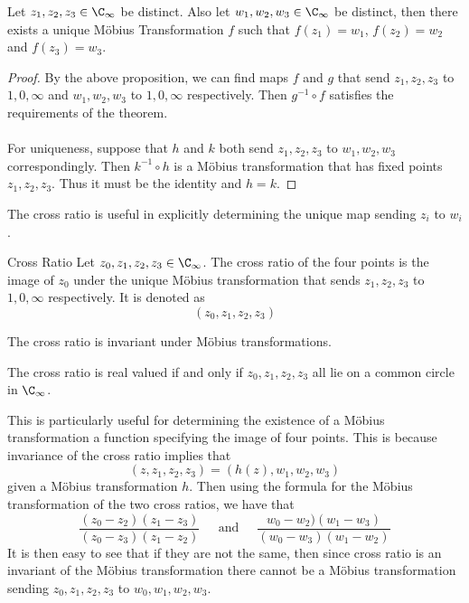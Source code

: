 \documentclass[a4paper]{article}
\begin{document}
\begin{thm}{}{} Let $z_1,z_2,z_3\in\C_\infty$ be distinct. Also let $w_1,w_2,w_3\in\C_\infty$ be distinct, then there exists a unique Möbius Transformation $f$ such that $f(z_1)=w_1$, $f(z_2)=w_2$ and $f(z_3)=w_3$. \tcbline
\begin{proof}
By the above proposition, we can find maps $f$ and $g$ that send $z_1,z_2,z_3$ to $1,0,\infty$ and $w_1,w_2,w_3$ to $1,0,\infty$ respectively. Then $g^{-1}\circ f$ satisfies the requirements of the theorem. \\~\\

For uniqueness, suppose that $h$ and $k$ both send $z_1,z_2,z_3$ to $w_1,w_2,w_3$ correspondingly. Then $k^{-1}\circ h$ is a Möbius transformation that has fixed points $z_1,z_2,z_3$. Thus it must be the identity and $h=k$. 
\end{proof}
\end{thm}

The cross ratio is useful in explicitly determining the unique map sending $z_i$ to $w_i$. 

\begin{defn}{Cross Ratio}{} Let $z_0,z_1,z_2,z_3\in\C_\infty$. The cross ratio of the four points is the image of $z_0$ under the unique Möbius transformation that sends $z_1,z_2,z_3$ to $1,0,\infty$ respectively. It is denoted as $$(z_0,z_1,z_2,z_3)$$
\end{defn}

\begin{thm}{}{} The cross ratio is invariant under Möbius transformations. 
\end{thm}

\begin{thm}{}{} The cross ratio is real valued if and only if $z_0,z_1,z_2,z_3$ all lie on a common circle in $\C_\infty$. 
\end{thm}

This is particularly useful for determining the existence of a Möbius transformation a function specifying the image of four points. This is because invariance of the cross ratio implies that $$(z,z_1,z_2,z_3)=(h(z),w_1,w_2,w_3)$$ given a Möbius transformation $h$. Then using the formula for the Möbius transformation of the two cross ratios, we have that $$\frac{(z_0-z_2)(z_1-z_3)}{(z_0-z_3)(z_1-z_2)}\;\;\;\;\text{ and }\;\;\;\;\frac{w_0-w_2)(w_1-w_3)}{(w_0-w_3)(w_1-w_2)}$$ It is then easy to see that if they are not the same, then since cross ratio is an invariant of the Möbius transformation there cannot be a Möbius transformation sending $z_0,z_1,z_2,z_3$ to $w_0,w_1,w_2,w_3$. \\~\\
\end{document}
